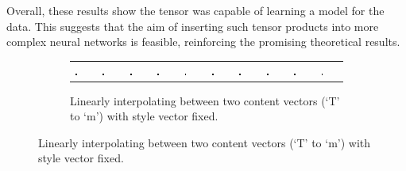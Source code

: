 Overall, these results show the tensor was capable of learning a model for the data.
This suggests that the aim of inserting such tensor products into more complex neural networks
is feasible, reinforcing the promising theoretical results.


\begin{figure}
	\begin{subfigure}[t]{\textwidth}
	\begin{tabu} to \textwidth {XXXXXXXXXX}
		\includegraphics[width=0.09\textwidth]{tensors/sandc/interp/output0} &
		\includegraphics[width=0.09\textwidth]{tensors/sandc/interp/output1} &
		\includegraphics[width=0.09\textwidth]{tensors/sandc/interp/output2} &
		\includegraphics[width=0.09\textwidth]{tensors/sandc/interp/output3} &
		\includegraphics[width=0.09\textwidth]{tensors/sandc/interp/output4} &
		\includegraphics[width=0.09\textwidth]{tensors/sandc/interp/output5} &
		\includegraphics[width=0.09\textwidth]{tensors/sandc/interp/output6} &
		\includegraphics[width=0.09\textwidth]{tensors/sandc/interp/output7} &
		\includegraphics[width=0.09\textwidth]{tensors/sandc/interp/output8} &
		\includegraphics[width=0.09\textwidth]{tensors/sandc/interp/output9} 
	\end{tabu}
	\caption{Linearly interpolating between two content vectors (`T' to `m') with style vector
			 fixed.}
	\end{subfigure}
	

\end{figure}
